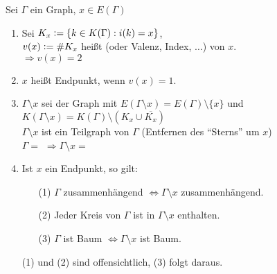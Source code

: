 \documentclass[a4paper, 10pt]{report}
\begin{document}
\begin{DefBem}
Sei $\Gamma$ ein Graph, $x \in E(\Gamma)$
\begin{enumerate}
  \item Sei $K_x \mathrel{\mathop:}= \{k \in K(\Gamma): i(k)=x\}$,\\
  $v(x) \mathrel{\mathop:}= \#K_x$ heißt  (oder Valenz,
  Index, $\ldots$) von $x$.\\

  $\Rightarrow v(x)=2$

  \item $x$ heißt Endpunkt, wenn $v(x) = 1$.
  \item $\Gamma \setminus x$ sei der Graph mit $E(\Gamma \setminus x) =
  E(\Gamma) \setminus \{x\}$ und $K(\Gamma \setminus x) = K(\Gamma) \setminus
  (K_x \cup \overline{K_x})$\\
  $\Gamma \setminus x$ ist ein Teilgraph von $\Gamma$ (Entfernen des ``Sterns''
  um $x$)\\
  
  
  $\Gamma=$
  $\Rightarrow \Gamma \setminus x = $
  

  \item Ist $x$ ein Endpunkt, so gilt:
  \begin{enumerate}
    \item[(1)] $\Gamma$ zusammenhängend $\Leftrightarrow \Gamma \setminus x$
    zusammenhängend.
    \item[(2)] Jeder Kreis von $\Gamma$ ist in $\Gamma \setminus x$ enthalten.
    \item[(3)] $\Gamma$ ist Baum $\Leftrightarrow \Gamma \setminus x$ ist Baum.
  \end{enumerate}
  \begin{Bew}
  (1) und (2) sind offensichtlich, (3) folgt daraus.
  \end{Bew}
\end{enumerate}
\end{DefBem}
\end{document}
